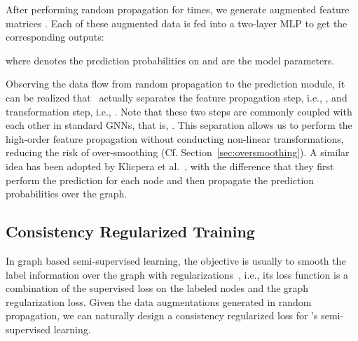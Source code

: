 After performing random propagation for  times, we generate  augmented feature matrices . 
Each of these augmented data is fed into a two-layer MLP to get the corresponding outputs:

where  denotes the prediction probabilities on  and  are the model parameters. 


Observing the data flow from random propagation to the prediction module, it can be realized that \model\ actually separates the feature propagation step, i.e., , and transformation step, i.e., . 
Note that these two steps are commonly coupled with each other in standard GNNs, that is, . 
This separation allows us to perform the high-order feature propagation 
without conducting non-linear transformations, reducing the risk of over-smoothing (Cf. Section~\ref{sec:oversmoothing}). 
A similar idea has been adopted by Klicpera et al.~\cite{klicpera2018predict}, with the difference that they first perform the prediction for each node and then propagate the prediction probabilities over the graph. 






























\subsection{Consistency Regularized Training}
\label{sec:consis}


In graph based semi-supervised learning, the objective is usually to smooth the label information over the graph with regularizations~\cite{zhu2003semi,weston2012deep,kipf2016semi}, i.e., its loss function is a combination of the supervised loss on the labeled nodes and the graph regularization loss. 
Given the  data augmentations generated in random propagation, 
we can naturally design a consistency regularized loss for \model's semi-supervised learning.  





